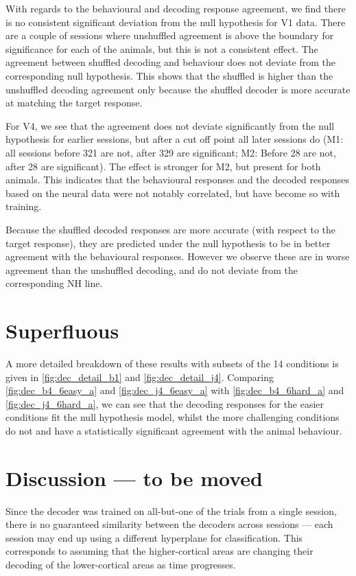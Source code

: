 With regards to the behavioural and decoding response agreement, we find there is no consistent significant deviation from the null hypothesis for \ac{V1} data.
There are a couple of sessions where unshuffled agreement is above the boundary for significance for each of the animals, but this is not a consistent effect.
The agreement between shuffled decoding and behaviour does not deviate from the corresponding null hypothesis.
This shows that the shuffled is higher than the unshuffled decoding agreement only because the shuffled decoder is more accurate at matching the target response.

For \ac{V4}, we see that the agreement does not deviate significantly from the null hypothesis for earlier sessions, but after a cut off point all later sessions do (\ac{M1}: all sessions before 321 are not, after 329 are significant; \ac{M2}: Before 28 are not, after 28 are significant).
The effect is stronger for \ac{M2}, but present for both animals.
This indicates that the behavioural responses and the decoded responses based on the neural data were not notably correlated, but have become so with training.

Because the shuffled decoded responses are more accurate (with respect to the target response), they are predicted under the null hypothesis to be in better agreement with the behavioural responses.
However we observe these are in worse agreement than the unshuffled decoding, and do not deviate from the corresponding \ac{NH} line.


\section{Superfluous}

A more detailed breakdown of these results with subsets of the 14 conditions is given in \autoref{fig:dec_detail_b1} and \autoref{fig:dec_detail_j4}.
Comparing \autoref{fig:dec_b4_6easy_a} and \autoref{fig:dec_j4_6easy_a} with \autoref{fig:dec_b4_6hard_a} and \autoref{fig:dec_j4_6hard_a}, we can see that the decoding responses for the easier conditions fit the null hypothesis model, whilst the more challenging conditions do not and have a statistically significant agreement with the animal behaviour.


\section{Discussion --- to be moved}

Since the decoder was trained on all-but-one of the trials from a single session, there is no guaranteed similarity between the decoders across sessions --- each session may end up using a different hyperplane for classification.
This corresponds to assuming that the higher-cortical areas are changing their decoding of the lower-cortical areas as time progresses.
